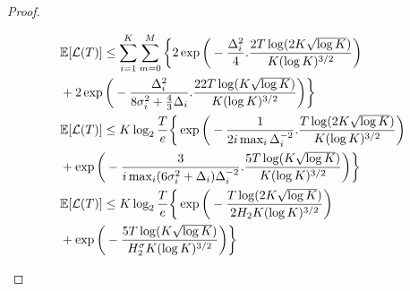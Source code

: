 \begin{proof}
\begin{small}
\begin{align*}
&\mathbb{E}[\mathcal{L}(T)] \leq \sum_{i=1}^{K}\sum_{m=0}^{M}\bigg\lbrace 2\exp\bigg( -\frac{\Delta_{i}^{2}}{4}.\frac{2T\log (2 K\sqrt{\log K})}{K (\log K)^{3/2}}\bigg)\\
& + 2\exp\bigg(- \frac{\Delta_{i}^{2}}{8\sigma_{i}^{2}+ \frac{4}{3}\Delta_i}.\frac{22T\log ( K\sqrt{\log K})}{ K(\log K)^{3/2}} \bigg)\bigg\rbrace\\
&\mathbb{E}[\mathcal{L}(T)] \leq K\log_2\frac{T}{e}\bigg\lbrace\exp\bigg( -\frac{1}{2i\max_{i}\Delta_{i}^{-2}}.\frac{T\log (2 K\sqrt{\log K})}{K (\log K)^{3/2}}\bigg)\\
& + \exp\bigg(- \frac{3}{i\max_i(6\sigma_{i}^{2}+ \Delta_i)\Delta_{i}^{-2}}.\frac{5T\log ( K\sqrt{\log K})}{ K(\log K)^{3/2}} \bigg)\bigg\rbrace\\
&\mathbb{E}[\mathcal{L}(T)] \leq K\log_2\frac{T}{e}\bigg\lbrace\exp\bigg( -\frac{T\log (2 K\sqrt{\log K})}{2 H_2 K (\log K)^{3/2}}\bigg)\\
& + \exp\bigg(- \frac{5T\log ( K\sqrt{\log K})}{H_{2}^{\sigma} K(\log K)^{3/2}} \bigg)\bigg\rbrace\\
\end{align*}
\end{small}


%
%

\end{proof}


